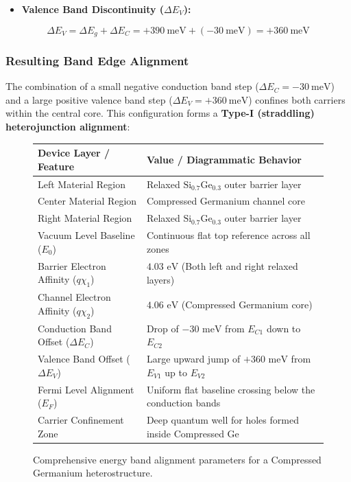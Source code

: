 \documentclass[
]{article}
\providecommand{\tightlist}{%
  \setlength{\itemsep}{0pt}\setlength{\parskip}{0pt}}
\begin{document}
\begin{itemize}
\tightlist
\item
  \textbf{Valence Band Discontinuity (\(\Delta E_V\)):}
\end{itemize}

\[\Delta E_V = \Delta E_g + \Delta E_C = +390\ \text{meV} + (-30\ \text{meV}) = +360\ \text{meV}\]

\subsubsection{Resulting Band Edge
Alignment}\label{resulting-band-edge-alignment-1}

The combination of a small negative conduction band step
(\(\Delta E_C = -30\ \text{meV}\)) and a large positive valence band
step (\(\Delta E_V = +360\ \text{meV}\)) confines both carriers within
the central core. This configuration forms a \textbf{Type-I (straddling)
heterojunction alignment}:

\begin{figure}[h!]
\centering
\renewcommand{\arraystretch}{1.4}
\begin{tabular}{|l|l|}
\hline
\textbf{Device Layer / Feature} & \textbf{Value / Diagrammatic Behavior} \\ \hline
Left Material Region & Relaxed $\text{Si}_{0.7}\text{Ge}_{0.3}$ outer barrier layer \\ \hline
Center Material Region & Compressed Germanium channel core \\ \hline
Right Material Region & Relaxed $\text{Si}_{0.7}\text{Ge}_{0.3}$ outer barrier layer \\ \hline
Vacuum Level Baseline ($E_0$) & Continuous flat top reference across all zones \\ \hline
Barrier Electron Affinity ($q\chi_1$) & $4.03\text{ eV}$ (Both left and right relaxed layers) \\ \hline
Channel Electron Affinity ($q\chi_2$) & $4.06\text{ eV}$ (Compressed Germanium core) \\ \hline
Conduction Band Offset ($\Delta E_C$) & Drop of $-30\text{ meV}$ from $E_{C1}$ down to $E_{C2}$ \\ \hline
Valence Band Offset ($\Delta E_V$) & Large upward jump of $+360\text{ meV}$ from $E_{V1}$ up to $E_{V2}$ \\ \hline
Fermi Level Alignment ($E_F$) & Uniform flat baseline crossing below the conduction bands \\ \hline
Carrier Confinement Zone & Deep quantum well for holes formed inside Compressed Ge \\ \hline
\end{tabular}
\caption{Comprehensive energy band alignment parameters for a Compressed Germanium heterostructure.}
\end{figure}
\end{document}

